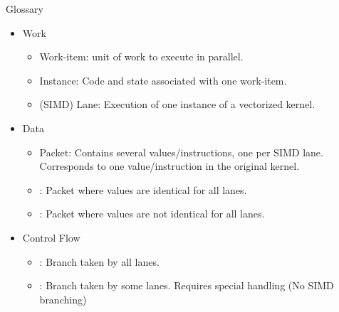 \begin{frame}{Glossary}

\begin{itemize}
    \item Work
    \begin{itemize}
        \item Work-item: unit of work to execute in parallel.
        \item Instance: Code and state associated with one work-item.
        \item (SIMD) Lane: Execution of one instance of a vectorized kernel.
        \end{itemize}
        
    \item Data
    \begin{itemize}
        \item Packet: Contains several values/instructions, one per SIMD lane. Corresponds to one value/instruction in the original kernel.
        \item {}: Packet where values are identical for all lanes.
        \item {}: Packet where values are not identical for all lanes.
        \end{itemize}

    \item Control Flow
    \begin{itemize}
        \item {}: Branch taken by all lanes.
        \item {}: Branch taken by some lanes. Requires special handling (No SIMD branching)
    \end{itemize}
\end{itemize}

\end{frame}
